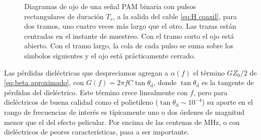 \begin{figure}
    \begin{center}
    \end{center}
    \caption{Diagramas de ojo de una señal PAM binaria con pulsos rectangulares de duración $T_s$, a la salida del cable \eqref{eq:H coaxil}, para dos tramos, uno cuatro veces más largo que el otro. Las trazas están centradas en el instante de muestreo. Con el tramo corto el ojo está abierto. Con el tramo largo, la cola de cada pulso se suma sobre los símbolos siguientes y el ojo está prácticamente cerrado.}\label{fig:ojo cable}
\end{figure}

Las pérdidas dieléctricas que despreciamos agregan a $\alpha(f)$ el término $GZ_0/2$ de \eqref{eq:beta aproximado}, con $G(f)=2\pi f C\tan\theta_{\text{d}}$, donde $\tan\theta_{\text{d}}$ es la tangente de pérdidas del dieléctrico. Este término crece linealmente con $f$, pero para dieléctricos de buena calidad como el polietileno ($\tan\theta_{\text{d}}\sim 10^{-4}$) su aporte en el rango de frecuencias de interés es típicamente uno o dos órdenes de magnitud menor que el del efecto pelicular. Por encima de las centenas de $\unit{\mega\hertz}$, o con dieléctricos de peores características, pasa a ser importante.

